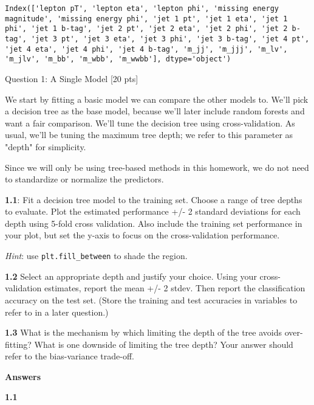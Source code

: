 \documentclass[11pt]{article}
\begin{document}
    
    \begin{verbatim}
Index(['lepton pT', 'lepton eta', 'lepton phi', 'missing energy magnitude', 'missing energy phi', 'jet 1 pt', 'jet 1 eta', 'jet 1 phi', 'jet 1 b-tag', 'jet 2 pt', 'jet 2 eta', 'jet 2 phi', 'jet 2 b-tag', 'jet 3 pt', 'jet 3 eta', 'jet 3 phi', 'jet 3 b-tag', 'jet 4 pt', 'jet 4 eta', 'jet 4 phi', 'jet 4 b-tag', 'm_jj', 'm_jjj', 'm_lv', 'm_jlv', 'm_bb', 'm_wbb', 'm_wwbb'], dtype='object')
    \end{verbatim}

    
     Question 1: A Single Model {[}20 pts{]}

We start by fitting a basic model we can compare the other models to.
We'll pick a decision tree as the base model, because we'll later
include random forests and want a fair comparison. We'll tune the
decision tree using cross-validation. As usual, we'll be tuning the
maximum tree depth; we refer to this parameter as "depth" for
simplicity.

Since we will only be using tree-based methods in this homework, we do
not need to standardize or normalize the predictors.

    \textbf{1.1}: Fit a decision tree model to the training set. Choose a
range of tree depths to evaluate. Plot the estimated performance +/- 2
standard deviations for each depth using 5-fold cross validation. Also
include the training set performance in your plot, but set the y-axis to
focus on the cross-validation performance.

\emph{Hint}: use \texttt{plt.fill\_between} to shade the region.

\textbf{1.2} Select an appropriate depth and justify your choice. Using
your cross-validation estimates, report the mean +/- 2 stdev. Then
report the classification accuracy on the test set. (Store the training
and test accuracies in variables to refer to in a later question.)

\textbf{1.3} What is the mechanism by which limiting the depth of the
tree avoids over-fitting? What is one downside of limiting the tree
depth? Your answer should refer to the bias-variance trade-off.

    \textbf{Answers}

    \textbf{1.1}
\end{document}
